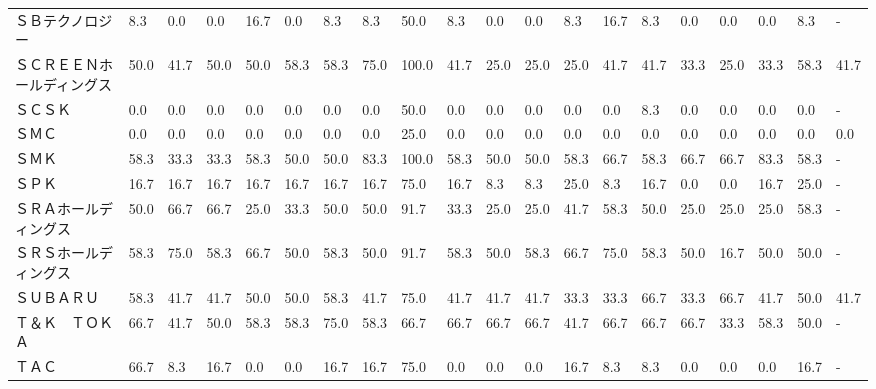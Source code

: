 \begin{tabular}{llllllllllllllllllll}
ＳＢテクノロジー        &    8.3 &    0.0 &       0.0 &      16.7 &        0.0 &    8.3 &    8.3 &   50.0 &     8.3 &     0.0 &    0.0 &   8.3 &   16.7 &     8.3 &     0.0 &   0.0 &   0.0 &   8.3 &     - \\
ＳＣＲＥＥＮホールディングス  &   50.0 &   41.7 &      50.0 &      50.0 &       58.3 &   58.3 &   75.0 &  100.0 &    41.7 &    25.0 &   25.0 &  25.0 &   41.7 &    41.7 &    33.3 &  25.0 &  33.3 &  58.3 &  41.7 \\
ＳＣＳＫ            &    0.0 &    0.0 &       0.0 &       0.0 &        0.0 &    0.0 &    0.0 &   50.0 &     0.0 &     0.0 &    0.0 &   0.0 &    0.0 &     8.3 &     0.0 &   0.0 &   0.0 &   0.0 &     - \\
ＳＭＣ             &    0.0 &    0.0 &       0.0 &       0.0 &        0.0 &    0.0 &    0.0 &   25.0 &     0.0 &     0.0 &    0.0 &   0.0 &    0.0 &     0.0 &     0.0 &   0.0 &   0.0 &   0.0 &   0.0 \\
ＳＭＫ             &   58.3 &   33.3 &      33.3 &      58.3 &       50.0 &   50.0 &   83.3 &  100.0 &    58.3 &    50.0 &   50.0 &  58.3 &   66.7 &    58.3 &    66.7 &  66.7 &  83.3 &  58.3 &     - \\
ＳＰＫ             &   16.7 &   16.7 &      16.7 &      16.7 &       16.7 &   16.7 &   16.7 &   75.0 &    16.7 &     8.3 &    8.3 &  25.0 &    8.3 &    16.7 &     0.0 &   0.0 &  16.7 &  25.0 &     - \\
ＳＲＡホールディングス     &   50.0 &   66.7 &      66.7 &      25.0 &       33.3 &   50.0 &   50.0 &   91.7 &    33.3 &    25.0 &   25.0 &  41.7 &   58.3 &    50.0 &    25.0 &  25.0 &  25.0 &  58.3 &     - \\
ＳＲＳホールディングス     &   58.3 &   75.0 &      58.3 &      66.7 &       50.0 &   58.3 &   50.0 &   91.7 &    58.3 &    50.0 &   58.3 &  66.7 &   75.0 &    58.3 &    50.0 &  16.7 &  50.0 &  50.0 &     - \\
ＳＵＢＡＲＵ          &   58.3 &   41.7 &      41.7 &      50.0 &       50.0 &   58.3 &   41.7 &   75.0 &    41.7 &    41.7 &   41.7 &  33.3 &   33.3 &    66.7 &    33.3 &  66.7 &  41.7 &  50.0 &  41.7 \\
Ｔ＆Ｋ　ＴＯＫＡ        &   66.7 &   41.7 &      50.0 &      58.3 &       58.3 &   75.0 &   58.3 &   66.7 &    66.7 &    66.7 &   66.7 &  41.7 &   66.7 &    66.7 &    66.7 &  33.3 &  58.3 &  50.0 &     - \\
ＴＡＣ             &   66.7 &    8.3 &      16.7 &       0.0 &        0.0 &   16.7 &   16.7 &   75.0 &     0.0 &     0.0 &    0.0 &  16.7 &    8.3 &     8.3 &     0.0 &   0.0 &   0.0 &  16.7 &     - \\

\end{tabular}
